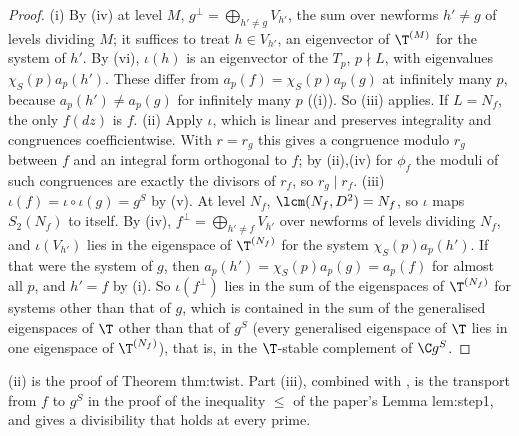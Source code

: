 \begin{proof}
(i) By (iv) at level $M$, $g^\perp=\bigoplus_{h'\ne g}V_{h'}$, the sum over newforms $h'\ne g$ of levels dividing $M$; it suffices to treat $h\in V_{h'}$, an eigenvector of
$\T^{(M)}$ for the system of $h'$. By (vi), $\iota(h)$ is an eigenvector of the $T_p$, $p\nmid L$, with eigenvalues $\chi_S(p)a_p(h')$. These differ from
$a_p(f)=\chi_S(p)a_p(g)$ at infinitely many $p$, because $a_p(h')\ne a_p(g)$ for infinitely many $p$ ((i)). So (iii) applies. If
$L=N_f$, the only $f(dz)$ is $f$. (ii) Apply $\iota$, which is linear and preserves integrality and congruences coefficientwise. With $r=r_g$ this gives a congruence modulo $r_g$ between $f$ and an integral form
orthogonal to $f$; by (ii),(iv) for $\phi_f$ the moduli of such congruences are exactly the divisors of $r_f$, so $r_g\mid r_f$. (iii) $\iota(f)=\iota\circ\iota(g)=g^S$ by
(v). At level $N_f$, $\lcm(N_f,D^2)=N_f$, so $\iota$ maps $S_2(N_f)$ to itself. By (iv), $f^\perp=\bigoplus_{h'\ne f}V_{h'}$ over newforms of
levels dividing $N_f$, and $\iota(V_{h'})$ lies in the eigenspace of $\T^{(N_f)}$ for the system $\chi_S(p)a_p(h')$. If that were the system of $g$, then $a_p(h')=\chi_S(p)a_p(g)=a_p(f)$ for almost all $p$,
and $h'=f$ by (i). So $\iota(f^\perp)$ lies in the sum of the eigenspaces of $\T^{(N_f)}$ for systems other than that of $g$, which is contained in the sum of
the generalised eigenspaces of $\T$ other than that of $g^S$ (every generalised eigenspace of $\T$ lies in one eigenspace of $\T^{(N_f)}$), that is, in the $\T$-stable complement of $\C g^S$.
\end{proof}

(ii) is the proof of Theorem thm:twist. Part (iii), combined with , is the transport from $f$ to $g^S$ in the proof of the
inequality $\le$ of the paper's Lemma lem:step1, and gives a divisibility that holds at every prime.

